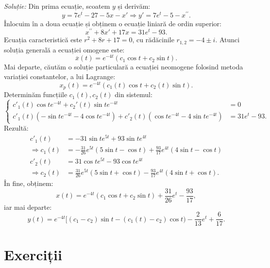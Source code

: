 \emph{Soluție:} Din prima ecuație, scoatem $y$ și derivăm:
\[
  y = 7e^t - 27 - 5x - x' \Rightarrow y' = 7e^t - 5 - x^{\prime\prime}.
\]
Înlocuim în a doua ecuație și obținem o ecuație liniară de ordin superior:
\[
  x^{\prime\prime} + 8x' + 17x = 31e^t - 93.
\]
Ecuația caracteristică este $r^2 + 8r + 17 = 0$, cu rădăcinile $r_{1,2} = -4 \pm i$.
Atunci soluția generală a ecuației omogene este:
\[
  \overline{x}(t) = e^{-4t}(c_1 \cos t + c_2 \sin t).
\]
Mai departe, căutăm o soluție particulară a ecuației neomogene folosind metoda
variației constantelor, a lui Lagrange:
\[
  x_p(t) = e^{-4t}(c_1(t) \cos t + c_2(t) \sin t).
\]
Determinăm funcțiile $c_1(t), c_2(t)$ din sistemul:
\[
  \begin{cases}
    c'_1(t) \cos t e^{-4t} + c_2'(t) \sin t e^{-4t} &= 0 \\
    c'_1(t) (-\sin t e^{-4t} - 4\cos t e^{-4t}) + %
    c'_2(t) (\cos t e^{-4t} - 4\sin t e^{-4t}) &= 31e^t - 93.
  \end{cases}
\]
Rezultă:
\begin{align*}
  c'_1(t) &= -31 \sin t e^{5t} + 93 \sin t e^{4t} \\
  \Rightarrow c_1(t) &= -\frac{31}{26} e^{5t}(5 \sin t - \cos t) + %
                       \frac{93}{17} e^{4t}(4 \sin t - \cos t) \\
  c'_2(t) &= 31 \cos t e^{5t} - 93\cos t e^{4t} \\
  \Rightarrow c_2(t) &= \frac{31}{26} e^{5t}(5 \sin t + \cos t) - %
                       \frac{93}{17} e^{4t}(4 \sin t + \cos t).
\end{align*}
În fine, obținem:
\[
  x(t) = e^{-4t}(c_1 \cos t + c_2 \sin t) + \frac{31}{26}e^t - \frac{93}{17},
\]
iar mai departe:
\[
  y(t) = e^{-4t}[(c_1 - c_2) \sin t - (c_1(t) - c_2) \cos t) - \frac{2}{13} e^t + \frac{6}{17}.
\]

\vspace{1cm}



\section{Exerciții}

